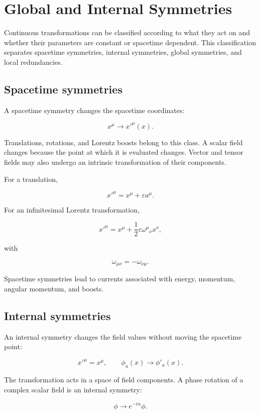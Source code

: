 \section{Global and Internal Symmetries}
\label{sec:global_internal_symmetries}

Continuous transformations can be classified according to what they act on and whether their parameters are constant or spacetime dependent. This classification separates spacetime symmetries, internal symmetries, global symmetries, and local redundancies.

\subsection{Spacetime symmetries}

A spacetime symmetry changes the spacetime coordinates:

\[
x^{\mu}
\longrightarrow
x'^{\mu}(x).
\]

Translations, rotations, and Lorentz boosts belong to this class. A scalar field changes because the point at which it is evaluated changes. Vector and tensor fields may also undergo an intrinsic transformation of their components.

For a translation,

\[
x'^{\mu}
=
x^{\mu}
+
\varepsilon a^{\mu}.
\]

For an infinitesimal Lorentz transformation,

\[
x'^{\mu}
=
x^{\mu}
+
\frac{1}{2}
\varepsilon
\omega^{\mu}{}_{\nu}x^{\nu},
\]

with

\[
\omega_{\mu\nu}
=
-\omega_{\nu\mu}.
\]

Spacetime symmetries lead to currents associated with energy, momentum, angular momentum, and boosts.

\subsection{Internal symmetries}

An internal symmetry changes the field values without moving the spacetime point:

\[
x'^{\mu}=x^{\mu},
\qquad
\phi_a(x)
\longrightarrow
\phi'_a(x).
\]

The transformation acts in a space of field components. A phase rotation of a complex scalar field is an internal symmetry:

\[
\phi
\longrightarrow
e^{-i\alpha}\phi.
\]

